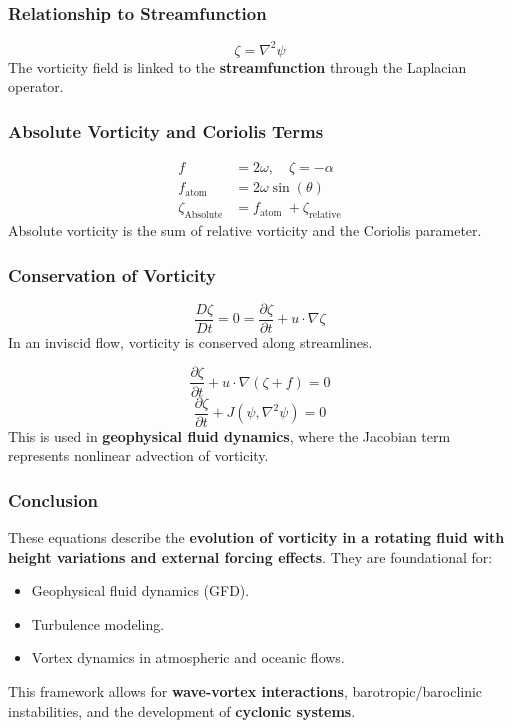 \documentclass[a4paper,10pt]{article}
\begin{document}
    \subsubsection*{Relationship to Streamfunction}
    \begin{equation*}
        \zeta = \nabla^2 \psi
    \end{equation*}
    The vorticity field is linked to the \textbf{streamfunction} through the Laplacian operator.

    \subsubsection*{Absolute Vorticity and Coriolis Terms}
    \begin{align}
        f &= 2 \omega, \quad \zeta=-\alpha \\
        f_\text{atom} &= 2 \omega \sin (\theta) \\
        \zeta_\text{Absolute} &= f_\text{atom }+\zeta_\text{relative}
    \end{align}
    Absolute vorticity is the sum of relative vorticity and the Coriolis parameter.

    \subsubsection*{Conservation of Vorticity}
    \begin{equation*}
        \frac{D \zeta}{D t}=0=\frac{\partial \zeta}{\partial t}+u \cdot \nabla \zeta
    \end{equation*}
    In an inviscid flow, vorticity is conserved along streamlines.

    \begin{equation*}
        \frac{\partial \zeta}{\partial t} + u \cdot \nabla(\zeta + f)=0
    \end{equation*}
    \begin{equation*}
        \frac{\partial \zeta}{\partial t}+J(\psi, \nabla^2 \psi)=0
    \end{equation*}
    This is used in \textbf{geophysical fluid dynamics}, where the Jacobian term represents nonlinear advection of vorticity.

    \subsubsection*{Conclusion}
    These equations describe the \textbf{evolution of vorticity in a rotating fluid with height variations and external forcing effects}. They are foundational for:
    \begin{itemize}
        \item Geophysical fluid dynamics (GFD).
        \item Turbulence modeling.
        \item Vortex dynamics in atmospheric and oceanic flows.
    \end{itemize}
    This framework allows for \textbf{wave-vortex interactions}, barotropic/baroclinic instabilities, and the development of \textbf{cyclonic systems}.
\end{document}
